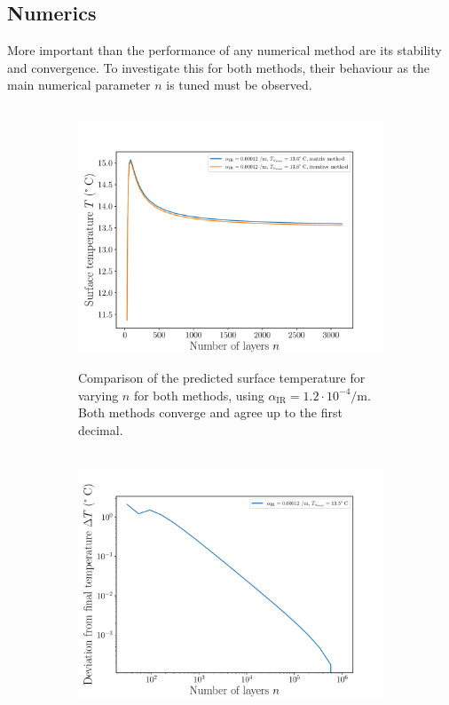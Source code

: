 \documentclass[a4paper,DIV=12,english]{scrartcl}
\begin{document}
\subsection{Numerics}
More important than the performance of any numerical method are its stability and convergence. To investigate this for both methods, their behaviour as the main numerical parameter $n$ is tuned must be observed.
\begin{figure}
    \centering
    \begin{subfigure}{0.49\textwidth}\
        \centering
        \includegraphics[width=\textwidth]{../plots/temp_comp/full_N_comp.pdf}
        \caption{Comparison of the predicted surface temperature for varying $n$ for both methods, using $\alpha_{\text{IR}}=1.2\cdot 10^{-4}/\text{m}$. Both methods converge and agree up to the first decimal.}
        \label{subfig:N_comp}        
    \end{subfigure}
    \begin{subfigure}{0.49\textwidth}\
        \centering
        \includegraphics[width=\textwidth]{../plots/temp_full_it/full_N.pdf}

\end{subfigure}
\end{figure}
\end{document}
